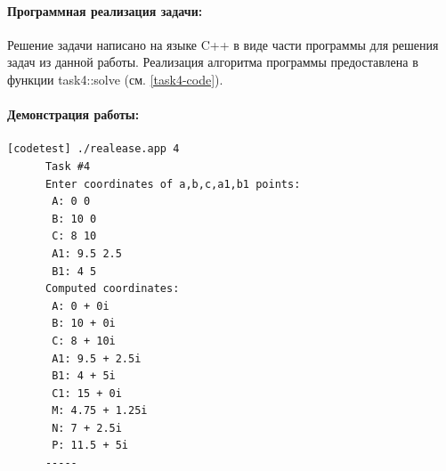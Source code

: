 {   \paragraph{Программная реализация задачи:} Решение задачи написано на языке C++ в виде части
   программы для решения задач из данной работы.
   Реализация алгоритма программы предоставлена в функции task4::solve (см. \ref{task4-code}).
   \paragraph{Демонстрация работы:}
   \vphantom{code}
   \begin{lstlisting}[language={},frame=none]
      [codetest] ./realease.app 4
      Task #4
      Enter coordinates of a,b,c,a1,b1 points:
       A: 0 0
       B: 10 0
       C: 8 10
       A1: 9.5 2.5
       B1: 4 5
      Computed coordinates:
       A: 0 + 0i
       B: 10 + 0i
       C: 8 + 10i
       A1: 9.5 + 2.5i
       B1: 4 + 5i
       C1: 15 + 0i
       M: 4.75 + 1.25i
       N: 7 + 2.5i
       P: 11.5 + 5i
      -----
   \end{lstlisting}
}
